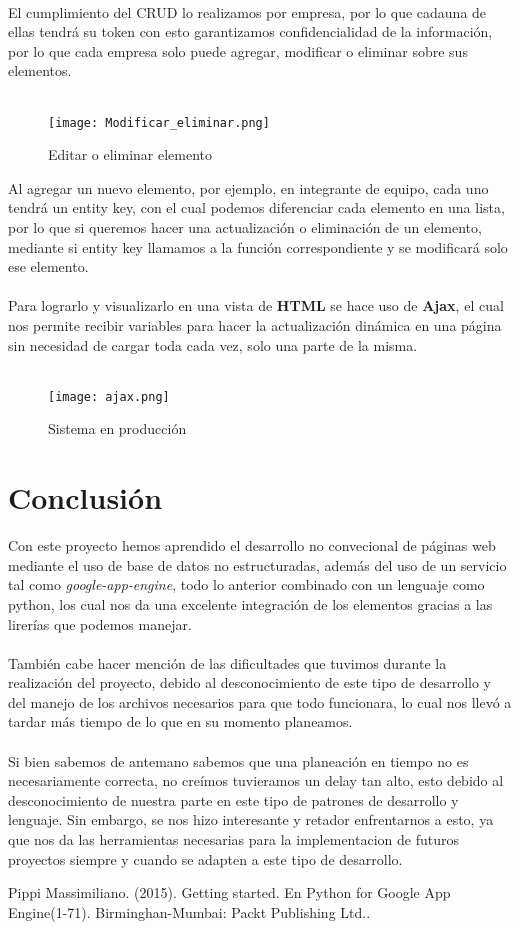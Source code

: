 \documentclass{article}
\begin{document}
\\
El cumplimiento del CRUD lo realizamos por empresa, por lo que cadauna de ellas tendrá su token con esto garantizamos confidencialidad de la información, por lo que cada empresa solo puede agregar, modificar o eliminar sobre sus elementos.
\\\\

\begin{figure}[h!]
\centering
\texttt{[image: Modificar\_eliminar.png]}
\caption{Editar o eliminar elemento}
\label{fig:crud}
\end{figure}

Al agregar un nuevo elemento, por ejemplo, en integrante de equipo, cada uno tendrá un entity key, con el cual podemos diferenciar cada elemento en una lista, por lo que si queremos hacer una actualización o eliminación de un elemento, mediante si entity key llamamos a la función correspondiente y se modificará solo ese elemento. 
\\\\
Para lograrlo y visualizarlo en una vista de {\bfseries HTML} se hace uso de {\bfseries Ajax}, el cual nos permite recibir variables para hacer la actualización dinámica en una página sin necesidad de cargar toda cada vez, solo una parte de la misma. 
\\\\
\begin{figure}[h!]
\centering
\texttt{[image: ajax.png]}
\caption{Sistema en producción}
\label{fig:admin}
\end{figure}



\section{Conclusión}
Con este proyecto hemos aprendido el desarrollo no convecional de páginas web mediante el uso de base de datos no estructuradas, además del uso de un servicio tal como \textit{google-app-engine}, todo lo anterior combinado con un lenguaje como python, los cual nos da una excelente integración de los elementos gracias a las lirerías que podemos manejar. 
\\\\
También cabe hacer mención de las dificultades que tuvimos durante la realización del proyecto, debido al desconocimiento de este tipo de desarrollo y del manejo de los archivos necesarios para que todo funcionara, lo cual nos llevó a tardar más tiempo de lo que en su momento planeamos. 
\\\\
Si bien sabemos de antemano sabemos que una planeación en tiempo no es necesariamente correcta, no creímos tuvieramos un delay tan alto, esto debido al desconocimiento de nuestra parte en este tipo de patrones de desarrollo y lenguaje. Sin embargo, se nos hizo interesante y retador enfrentarnos a esto, ya que nos da las herramientas necesarias para la implementacion de futuros proyectos siempre y cuando se adapten a este tipo de desarrollo. 



Pippi Massimiliano. (2015). Getting started. En Python for Google App Engine(1-71). Birminghan-Mumbai: Packt Publishing Ltd.. 
\end{document}
